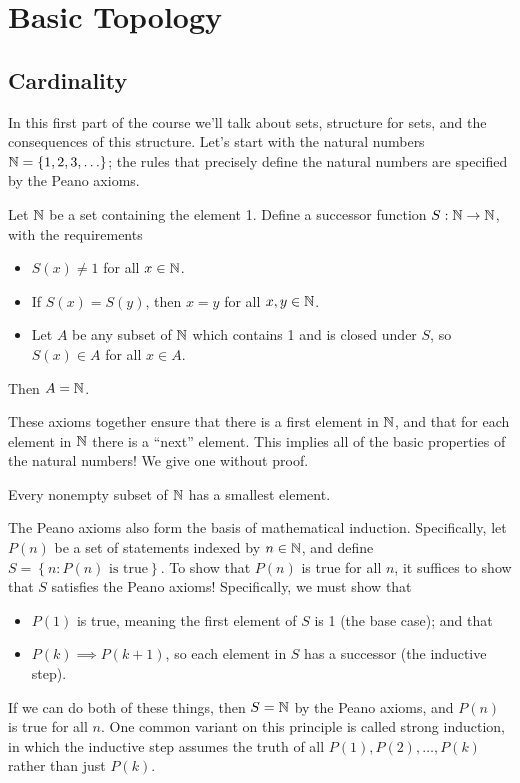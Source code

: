 \documentclass[../m131main.tex]{subfiles}
\begin{document}
\chapter{Basic Topology}
\section{Cardinality}
In this first part of the course we'll talk about sets, structure for sets, and the consequences of this structure.
Let's start with the natural numbers $\mathbb{N} = \left\{ 1, 2, 3, \ldots \right\}$; the rules that precisely define the natural numbers are specified by the Peano axioms.

\begin{definition}
    Let $\mathbb{N}$ be a set containing the element 1.
    Define a successor function $S : \mathbb{N} \to \mathbb{N}$, with the requirements
    \begin{itemize}
        \item $S(x) \neq 1$ for all $x \in \mathbb{N}$.
        \item If $S(x) = S(y)$, then $x = y$ for all $x,y \in \mathbb{N}$.
        \item Let $A$ be any subset of $\mathbb{N}$ which contains 1 and is closed under $S$, so $S(x) \in A$ for all $x \in A$.
    \end{itemize}
    Then $A = \mathbb{N}$.
\end{definition} %

These axioms together ensure that there is a first element in $\mathbb{N}$, and that for each element in $\mathbb{N}$ there is a ``next'' element.
This implies all of the basic properties of the natural numbers!
We give one without proof.

\begin{theorem}
    Every nonempty subset of $\mathbb{N}$ has a smallest element.
\end{theorem}

The Peano axioms also form the basis of mathematical induction.
Specifically, let $P(n)$ be a set of statements indexed by $n \in \mathbb{N}$, and define $S = \left\{ n : P(n) \text{ is true} \right\}$.
To show that $P(n)$ is true for all $n$, it suffices to show that $S$ satisfies the Peano axioms!
Specifically, we must show that
\begin{itemize}
    \item $P(1)$ is true, meaning the first element of $S$ is 1 (the base case); and that
    \item $P(k) \implies P(k+1)$, so each element in $S$ has a successor (the inductive step).
\end{itemize}
If we can do both of these things, then $S = \mathbb{N}$ by the Peano axioms, and $P(n)$ is true for all $n$.
One common variant on this principle is called strong induction, in which the inductive step assumes the truth of all $P(1), P(2), \ldots, P(k)$ rather than just $P(k)$.
\end{document}
